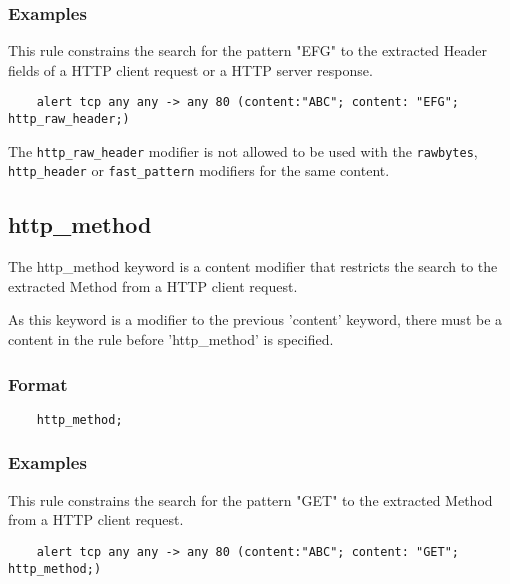 \documentclass[english]{report}
\newenvironment{note}{
\samepage
    \vspace{10pt}{\textsf{
        {\hspace{7pt}\Huge{$\triangle$\hspace{-12.5pt}{\Large{$^!$}}}}\hspace{5pt}
        {\Large{NOTE}}
    }
    }
   \begin{center}
    \par\vspace{-17pt}

    \begin{lrbox}{\savepar}
    \begin{minipage}[r]{6in}
}
{
    \end{minipage}
    \end{lrbox}
    \fbox{
        \usebox{
            \savepar
	}
    }
    \par\vskip10pt
    \end{center}
}
\newenvironment{note}{
        \begin{rawhtml}
        <p><table border="1"><tr><td><b>
        Note:&nbsp;&nbsp;</b>
        \end{rawhtml}
}{
        \begin{rawhtml}
        </b></td></tr></table></p>
        \end{rawhtml}
}
\begin{document}
\subsubsection{Examples}

This rule constrains the search for the pattern "EFG" to the extracted Header fields
of a HTTP client request or a HTTP server response.

\begin{verbatim}
    alert tcp any any -> any 80 (content:"ABC"; content: "EFG"; http_raw_header;)
\end{verbatim}

\begin{note}

The \texttt{http\_raw\_header} modifier is not allowed to be used with the
\texttt{rawbytes}, \texttt{http\_header} or \texttt{fast\_pattern} modifiers for the same
content.

\end{note}

\subsection{http\_method}
\label{sub:HttpMethod}

The http\_method keyword is a content modifier that restricts the search to the
extracted Method from a HTTP client request.

As this keyword is a modifier to the previous 'content' keyword, there must be
a content in the rule before 'http\_method' is specified.

\subsubsection{Format}

\begin{verbatim}
    http_method;
\end{verbatim}

\subsubsection{Examples}

This rule constrains the search for the pattern "GET" to the extracted Method
from a HTTP client request.

\begin{verbatim}
    alert tcp any any -> any 80 (content:"ABC"; content: "GET"; http_method;)
\end{verbatim}
\end{document}

